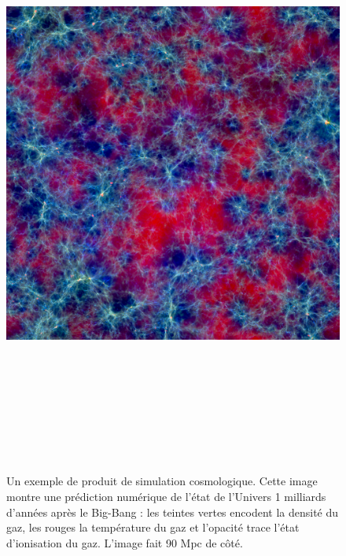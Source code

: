 \begin{figure}[htbp]
	\centering
		\includegraphics[height=20cm]{figs/simuemma.jpg}
	\caption{Un exemple de produit de simulation cosmologique. Cette image montre une prédiction numérique de l'état de l'Univers 1 milliards d'années après le Big-Bang : les teintes vertes encodent la densité du gaz, les rouges la température du gaz et l'opacité trace l'état d'ionisation du gaz. L'image fait 90 Mpc de côté.}
	\label{f:simuemma}
\end{figure}

